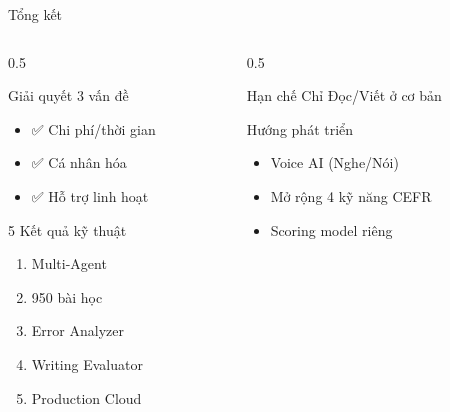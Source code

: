 \documentclass[notheorems,hyperref={bookmarks=true}]{beamer}
\begin{document}

\begin{frame}{Tổng kết}
\begin{columns}
    \begin{column}{0.5\textwidth}
        \begin{exampleblock}{Giải quyết 3 vấn đề}
            \begin{itemize}
                \item ✅ Chi phí/thời gian
                \item ✅ Cá nhân hóa
                \item ✅ Hỗ trợ linh hoạt
            \end{itemize}
        \end{exampleblock}
        
        \vspace{0.3cm}
        
        \begin{block}{5 Kết quả kỹ thuật}
            \footnotesize
            \begin{enumerate}
                \item Multi-Agent
                \item 950 bài học
                \item Error Analyzer
                \item Writing Evaluator
                \item Production Cloud
            \end{enumerate}
        \end{block}
    \end{column}
    \begin{column}{0.5\textwidth}
        \begin{alertblock}{Hạn chế}
            Chỉ Đọc/Viết ở cơ bản
        \end{alertblock}
        
        \vspace{0.3cm}
        
        \begin{exampleblock}{Hướng phát triển}
            \begin{itemize}
                \item Voice AI (Nghe/Nói)
                \item Mở rộng 4 kỹ năng CEFR
                \item Scoring model riêng
            \end{itemize}
        \end{exampleblock}
    \end{column}
\end{columns}
\end{frame}
\end{document}
